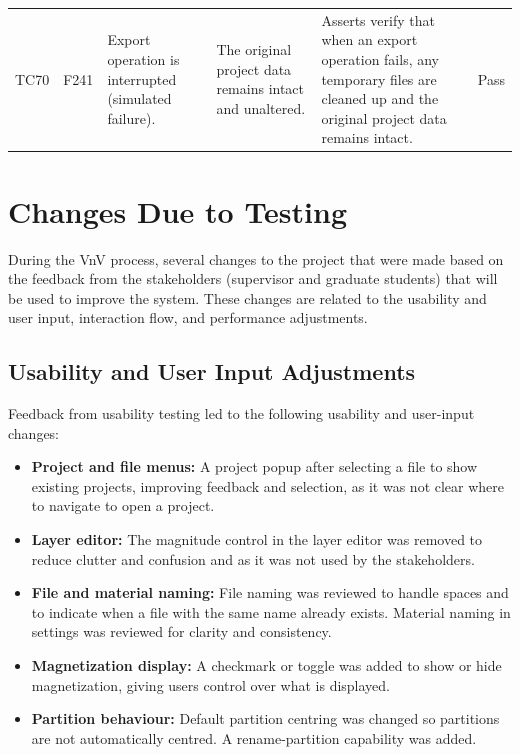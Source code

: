 \documentclass[12pt, titlepage]{article}
\begin{document}
\begin{longtable}{c
    >{\raggedright\arraybackslash}p{1.8cm}
    >{\raggedright\arraybackslash}p{3.5cm}
    >{\raggedright\arraybackslash}p{3.5cm}
  >{\raggedright\arraybackslash}p{5cm} c}
  TC70 & F241 & Export operation is interrupted (simulated failure). & The original project data remains intact and unaltered. & Asserts verify that when an export operation fails, any temporary files are cleaned up and the original project data remains intact. & \cellcolor{green} Pass \\
\end{longtable}

\section{Changes Due to Testing}
\label{sec:changes-due-to-testing}

During the VnV process, several changes to the project that were made based on the feedback from the stakeholders (supervisor and graduate students) that will be used to improve the system. These changes are related to the usability and user input, interaction flow, and performance adjustments.

\subsection{Usability and User Input Adjustments}

Feedback from usability testing led to the following usability and user-input changes:

\begin{itemize}
  \item \textbf{Project and file menus:} A project popup after selecting a file to show existing projects, improving feedback and selection, as it was not clear where to navigate to open a project.
  \item \textbf{Layer editor:} The magnitude control in the layer editor was removed to reduce clutter and confusion and as it was not used by the stakeholders.
  \item \textbf{File and material naming:} File naming was reviewed to handle spaces and to indicate when a file with the same name already exists. Material naming in settings was reviewed for clarity and consistency.
  \item \textbf{Magnetization display:} A checkmark or toggle was added to show or hide magnetization, giving users control over what is displayed.
  \item \textbf{Partition behaviour:} Default partition centring was changed so partitions are not automatically centred. A rename-partition capability was added.
\end{itemize}
\end{document}
